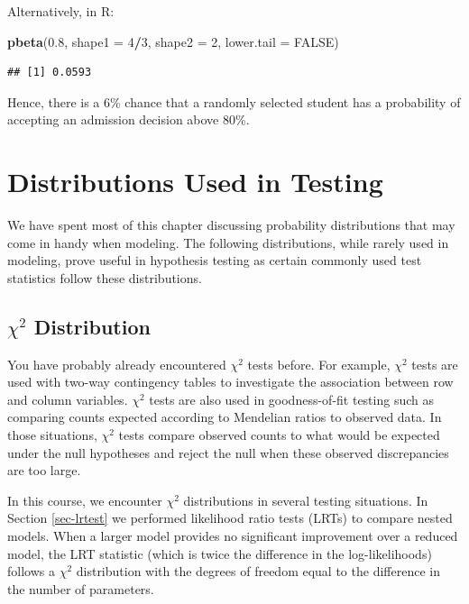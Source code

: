 \documentclass[
]{krantz}
\newenvironment{Shaded}{\begin{snugshade}}{\end{snugshade}}
\newcommand{\AttributeTok}[1]{\textcolor[rgb]{0.27,0.27,0.27}{#1}}
\newcommand{\ConstantTok}[1]{\textcolor[rgb]{0.37,0.37,0.37}{#1}}
\newcommand{\DecValTok}[1]{\textcolor[rgb]{0.06,0.06,0.06}{#1}}
\newcommand{\FloatTok}[1]{\textcolor[rgb]{0.06,0.06,0.06}{#1}}
\newcommand{\FunctionTok}[1]{\textcolor[rgb]{0.27,0.27,0.27}{\textbf{#1}}}
\newcommand{\NormalTok}[1]{#1}
\newcommand{\SpecialCharTok}[1]{\textcolor[rgb]{0.43,0.43,0.43}{\textbf{#1}}}
\begin{document}
Alternatively, in R:

\begin{Shaded}
\begin{Highlighting}[]
\FunctionTok{pbeta}\NormalTok{(}\FloatTok{0.8}\NormalTok{, }\AttributeTok{shape1 =} \DecValTok{4}\SpecialCharTok{/}\DecValTok{3}\NormalTok{, }\AttributeTok{shape2 =} \DecValTok{2}\NormalTok{, }\AttributeTok{lower.tail =} \ConstantTok{FALSE}\NormalTok{)}
\end{Highlighting}
\end{Shaded}

\begin{verbatim}
## [1] 0.0593
\end{verbatim}

Hence, there is a 6\% chance that a randomly selected student has a probability of accepting an admission decision above 80\%.

\section{Distributions Used in Testing}\label{distributions-used-in-testing}

We have spent most of this chapter discussing probability distributions that may come in handy when modeling. The following distributions, while rarely used in modeling, prove useful in hypothesis testing as certain commonly used test statistics follow these distributions.

\subsection{\texorpdfstring{\(\chi^2\) Distribution}{\textbackslash chi\^{}2 Distribution}}\label{chi2-distribution}

You have probably already encountered \(\chi^2\) tests before. For example, \(\chi^2\) tests are used with two-way contingency tables to investigate the association between row and column variables. \(\chi^2\) tests are also used in goodness-of-fit testing such as comparing counts expected according to Mendelian ratios to observed data. In those situations, \(\chi^2\) tests compare observed counts to what would be expected under the null hypotheses and reject the null when these observed discrepancies are too large.

In this course, we encounter \(\chi^2\) distributions  in several testing situations. In Section \ref{sec-lrtest} we performed likelihood ratio tests (LRTs) to compare nested models. When a larger model provides no significant improvement over a reduced model, the LRT statistic (which is twice the difference in the log-likelihoods) follows a \(\chi^2\) distribution with the degrees of freedom equal to the difference in the number of parameters.
\end{document}
